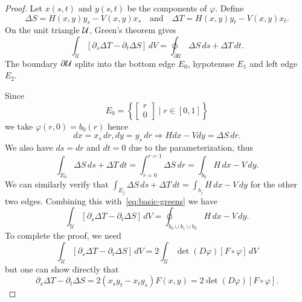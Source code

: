 \begin{proof}
Let \(x(s, t)\) and \(y(s, t)\) be the components of \(\varphi\). Define
\begin{equation}
\Delta S = H(x, y) y_s - V(x, y) x_s \quad \text{and} \quad
\Delta T = H(x, y) y_t - V(x, y) x_t.
\end{equation}
On the unit triangle \(\mathcal{U}\), Green's theorem gives
\begin{equation}\label{eq:basic-greens}
\int_{\mathcal{U}} \left[\partial_s \Delta T -
  \partial_t \Delta S\right] \, dV =
\oint_{\partial \mathcal{U}} \Delta S \, ds + \Delta T \, dt.
\end{equation}
The boundary \(\partial \mathcal{U}\) splits into the bottom edge \(E_0\),
hypotenuse \(E_1\) and left edge \(E_2\).

Since
\begin{equation}
E_0 = \left\{ \left[ \begin{array}{c} r \\ 0 \end{array}\right] \mid
  r \in \left[0, 1\right] \right\}
\end{equation}
we take \(\varphi(r, 0) = b_0(r)\) hence
\begin{equation}
dx = x_s \, dr, dy = y_s \, dr \Longrightarrow
H dx - V dy = \Delta S \, dr.
\end{equation}
We also have \(ds = dr\) and \(dt = 0\) due to the
parameterization, thus
\begin{equation}
\int_{E_0} \Delta S \, ds + \Delta T \, dt =
  \int_{r = 0}^{r = 1} \Delta S \, dr = \int_{b_0} H \, dx - V \, dy.
\end{equation}
We can similarly verify that
\(\int_{E_j} \Delta S \, ds + \Delta T \, dt = \int_{b_j} H \, dx - V \, dy\)
for the other two edges. Combining this with~\eqref{eq:basic-greens}
we have
\begin{equation}
\int_{\mathcal{U}} \left[\partial_s \Delta T -
  \partial_t \Delta S\right] \, dV =
\oint_{b_0 \cup b_1 \cup b_2} H \, dx - V \, dy.
\end{equation}
To complete the proof, we need
\begin{equation}
\int_{\mathcal{U}} \left[\partial_s \Delta T -
  \partial_t \Delta S\right] \, dV =
2 \int_{\mathcal{U}} \det(D\varphi) \left[F \circ \varphi\right] \, dV
\end{equation}
but one can show directly that
\begin{equation}
\partial_s \Delta T - \partial_t \Delta S =
  2 \left(x_s y_t - x_t y_s\right) F(x, y) =
  2 \det(D\varphi) \left[F \circ \varphi\right]. \tag*{\qedhere}
\end{equation}
\end{proof}

